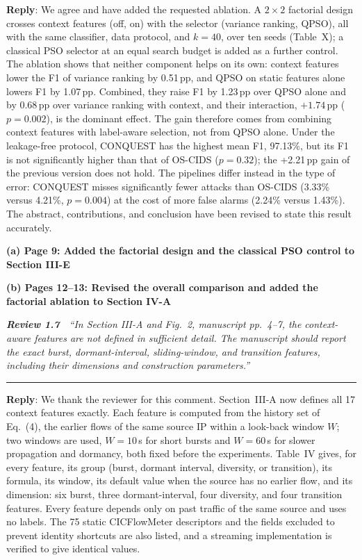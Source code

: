 \documentclass[11pt]{article}
\newcommand{\review}[2]{\par\bigskip\noindent\textbf{\textit{Review #1}}\ \ \textit{``#2''}\par\smallskip\hrule\medskip}
\newcommand{\reply}{\noindent\textbf{Reply}: }
\newcommand{\loc}[1]{\par\medskip\noindent\textbf{#1}\par}
\begin{document}
\reply We agree and have added the requested ablation. A $2\times2$ factorial
design crosses context features (off, on) with the selector (variance
ranking, QPSO), all with the same classifier, data protocol, and $k=40$, over
ten seeds (Table~X); a classical PSO selector at an equal search budget is
added as a further control. The ablation shows that neither component helps
on its own: context features lower the F1 of variance ranking by 0.51\,pp,
and QPSO on static features alone lowers F1 by 1.07\,pp. Combined, they raise
F1 by 1.23\,pp over QPSO alone and by 0.68\,pp over variance ranking with
context, and their interaction, $+1.74$\,pp ($p=0.002$), is the dominant
effect. The gain therefore comes from combining context features with
label-aware selection, not from QPSO alone. Under the leakage-free protocol,
CONQUEST has the highest mean F1, 97.13\%, but its F1 is not significantly
higher than that of OS-CIDS ($p=0.32$); the +2.21\,pp gain of the previous
version does not hold. The pipelines differ instead in the type of error:
CONQUEST misses significantly fewer attacks than OS-CIDS (3.33\% versus
4.21\%, $p=0.004$) at the cost of more false alarms (2.24\% versus 1.43\%).
The abstract, contributions, and conclusion have been revised to state this
result accurately.

\loc{(a) Page 9: Added the factorial design and the classical PSO control to Section III-E}

\loc{(b) Pages 12--13: Revised the overall comparison and added the factorial ablation to Section IV-A}

\review{1.7}{In Section III-A and Fig.~2, manuscript pp.~4--7, the context-aware features are not defined in sufficient detail. The manuscript should report the exact burst, dormant-interval, sliding-window, and transition features, including their dimensions and construction parameters.}

\reply We thank the reviewer for this comment. Section~III-A now defines all
17 context features exactly. Each feature is computed from the history set of
Eq.~(4), the earlier flows of the same source IP within a look-back window
$W$; two windows are used, $W=10$\,s for short bursts and $W=60$\,s for slower
propagation and dormancy, both fixed before the experiments. Table~IV gives,
for every feature, its group (burst, dormant interval, diversity, or
transition), its formula, its window, its default value when the source has
no earlier flow, and its dimension: six burst, three dormant-interval, four
diversity, and four transition features. Every feature depends only on past
traffic of the same source and uses no labels. The 75 static CICFlowMeter
descriptors and the fields excluded to prevent identity shortcuts are also
listed, and a streaming implementation is verified to give identical values.
\end{document}
